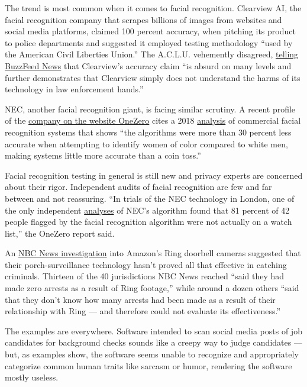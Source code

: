 The trend is most common when it comes to facial recognition. Clearview
AI, the facial recognition company that scrapes billions of images from
websites and social media platforms, claimed 100 percent accuracy, when
pitching its product to police departments and suggested it employed
testing methodology ``used by the American Civil Liberties Union.'' The
A.C.L.U. vehemently disagreed,
\href{https://www.buzzfeednews.com/article/carolinehaskins1/clearview-ai-facial-recognition-accurate-aclu-absurd}{telling
BuzzFeed News} that Clearview's accuracy claim ``is absurd on many
levels and further demonstrates that Clearview simply does not
understand the harms of its technology in law enforcement hands.''

NEC, another facial recognition giant, is facing similar scrutiny. A
recent profile of the
\href{https://onezero.medium.com/nec-is-the-most-important-facial-recognition-company-youve-never-heard-of-12381d530510}{company
on the website OneZero} cites a 2018
\href{http://gendershades.org/overview.html}{analysis} of commercial
facial recognition systems that shows ``the algorithms were more than 30
percent less accurate when attempting to identify women of color
compared to white men, making systems little more accurate than a coin
toss.''

Facial recognition testing in general is still new and privacy experts
are concerned about their rigor. Independent audits of facial
recognition are few and far between and not reassuring. ``In trials of
the NEC technology in London, one of the only independent
\href{https://news.sky.com/story/met-polices-facial-recognition-tech-has-81-error-rate-independent-report-says-11755941}{analyses}
of NEC's algorithm found that 81 percent of 42 people flagged by the
facial recognition algorithm were not actually on a watch list,'' the
OneZero report said.

An
\href{https://www.nbcnews.com/news/all/cute-videos-little-evidence-police-say-amazon-ring-isn-t-n1136026}{NBC
News investigation} into Amazon's Ring doorbell cameras suggested that
their porch-surveillance technology hasn't proved all that effective in
catching criminals. Thirteen of the 40 jurisdictions NBC News reached
``said they had made zero arrests as a result of Ring footage,'' while
around a dozen others ``said that they don't know how many arrests had
been made as a result of their relationship with Ring --- and therefore
could not evaluate its effectiveness.''

The examples are everywhere. Software intended to scan social media
posts of job candidates for background checks sounds like a creepy way
to judge candidates --- but, as examples show, the software seems unable
to recognize and appropriately categorize common human traits like
sarcasm or humor, rendering the software mostly useless.

